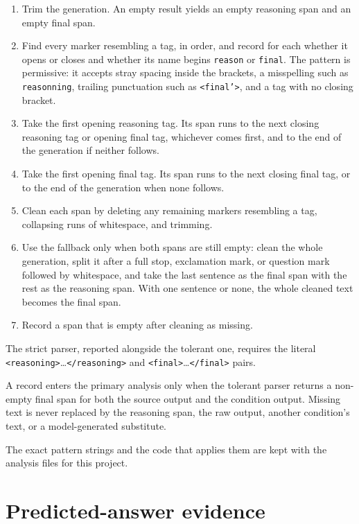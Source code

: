 \begin{enumerate}
\item Trim the generation. An empty result yields an empty reasoning span and an
empty final span.
\item Find every marker resembling a tag, in order, and record for each whether it opens
or closes and whether its name begins \texttt{reason} or \texttt{final}. The
pattern is permissive: it accepts stray spacing inside the brackets, a
misspelling such as \texttt{reasonning}, trailing punctuation such as
\texttt{<final'>}, and a tag with no closing bracket.
\item Take the first opening reasoning tag. Its span runs to the next closing
reasoning tag or opening final tag, whichever comes first, and to the end of the
generation if neither follows.
\item Take the first opening final tag. Its span runs to the next closing final
tag, or to the end of the generation when none follows.
\item Clean each span by deleting any remaining markers resembling a tag, collapsing
runs of whitespace, and trimming.
\item Use the fallback only when both spans are still empty: clean the whole
generation, split it after a full stop, exclamation mark, or question mark
followed by whitespace, and take the last sentence as the final span with the
rest as the reasoning span. With one sentence or none, the whole cleaned text
becomes the final span.
\item Record a span that is empty after cleaning as missing.
\end{enumerate}

The strict parser, reported alongside the tolerant one, requires the literal
\texttt{<reasoning>}\ldots\texttt{</reasoning>} and
\texttt{<final>}\ldots\texttt{</final>} pairs.

A record enters the primary analysis only when the tolerant parser returns a
non-empty final span for both the source output and the condition output. Missing text
is never replaced by the reasoning span, the raw output, another condition's
text, or a model-generated substitute.

The exact pattern strings and the code that applies them are kept with the
analysis files for this project.

\section{Predicted-answer evidence}
\label{sec:app-pred-a}

